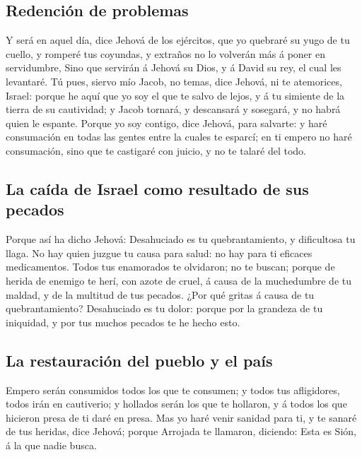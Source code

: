 \hypertarget{redenciuxf3n-de-problemas}{%
\subsection{Redención de problemas}\label{redenciuxf3n-de-problemas}}

 Y será en aquel día, dice Jehová de los ejércitos, que yo
quebraré su yugo de tu cuello, y romperé tus coyundas, y extraños no lo
volverán más á poner en servidumbre,  Sino que servirán á
Jehová su Dios, y á David su rey, el cual les levantaré. 
Tú pues, siervo mío Jacob, no temas, dice Jehová, ni te atemorices,
Israel: porque he aquí que yo soy el que te salvo de lejos, y á tu
simiente de la tierra de su cautividad; y Jacob tornará, y descansará y
sosegará, y no habrá quien le espante.  Porque yo soy
contigo, dice Jehová, para salvarte: y haré consumación en todas las
gentes entre la cuales te esparcí; en ti empero no haré consumación,
sino que te castigaré con juicio, y no te talaré del todo.

\hypertarget{la-cauxedda-de-israel-como-resultado-de-sus-pecados}{%
\subsection{La caída de Israel como resultado de sus
pecados}\label{la-cauxedda-de-israel-como-resultado-de-sus-pecados}}

 Porque así ha dicho Jehová: Desahuciado es tu
quebrantamiento, y dificultosa tu llaga.  No hay quien
juzgue tu causa para salud: no hay para ti eficaces medicamentos.
 Todos tus enamorados te olvidaron; no te buscan; porque de
herida de enemigo te herí, con azote de cruel, á causa de la muchedumbre
de tu maldad, y de la multitud de tus pecados.  ¿Por qué
gritas á causa de tu quebrantamiento? Desahuciado es tu dolor: porque
por la grandeza de tu iniquidad, y por tus muchos pecados te he hecho
esto.

\hypertarget{la-restauraciuxf3n-del-pueblo-y-el-pauxeds}{%
\subsection{La restauración del pueblo y el
país}\label{la-restauraciuxf3n-del-pueblo-y-el-pauxeds}}

 Empero serán consumidos todos los que te consumen; y todos
tus afligidores, todos irán en cautiverio; y hollados serán los que te
hollaron, y á todos los que hicieron presa de ti daré en presa.
 Mas yo haré venir sanidad para ti, y te sanaré de tus
heridas, dice Jehová; porque Arrojada te llamaron, diciendo: Esta es
Sión, á la que nadie busca.

